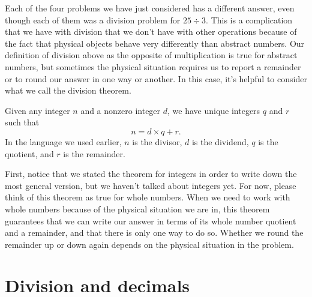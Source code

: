 \documentclass{ximera}
\begin{document}
Each of the four problems we have just considered has a different answer, even though each of them was a division problem for $25 \div 3$. This is a complication that we have with division that we don't have with other operations because of the fact that physical objects behave very differently than abstract numbers. Our definition of division above as the opposite of multiplication is true for abstract numbers, but sometimes the physical situation requires us to report a remainder or to round our answer in one way or another. In this case, it's helpful to consider what we call the division theorem.

\begin{theorem}
Given any integer $n$ and a nonzero integer $d$, we have unique integers $q$ and $r$ such that 
\[
n = d \times q + r.
\]
In the language we used earlier, $n$ is the divisor, $d$ is the dividend, $q$ is the quotient, and $r$ is the remainder.
\end{theorem}
First, notice that we stated the theorem for integers in order to write down the most general version, but we haven't talked about integers yet. For now, please think of this theorem as true for whole numbers. When we need to work with whole numbers because of the physical situation we are in, this theorem guarantees that we can write our answer in terms of its whole number quotient and a remainder, and that there is only one way to do so. Whether we round the remainder up or down again depends on the physical situation in the problem.



\section{Division and decimals}
\end{document}
